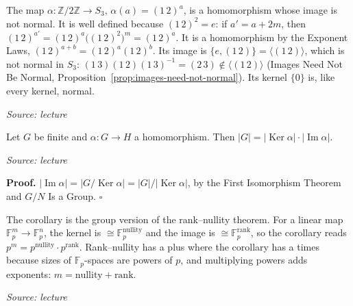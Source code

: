 \documentclass[11pt]{report}
\renewenvironment{proof}[1][Proof]{\noindent\textbf{#1.} }{\hfill$\square$\par\vspace{5pt}}
\newcommand{\srcline}[1]{\par\hfill{\footnotesize\textit{Source: #1}}}
\begin{document}
\begin{exbox}\label{ex:first-iso-z2-to-s3-non-normal-image}
The map $\alpha: \mathbb{Z}/2\mathbb{Z} \to S_3$, $\alpha(a) = (1\,2)^a$, is a homomorphism whose image is not normal. It is well defined because $(1\,2)^2 = e$: if $a' = a + 2m$, then $(1\,2)^{a'} = (1\,2)^a\big((1\,2)^2\big)^m = (1\,2)^a$. It is a homomorphism by the Exponent Laws, $(1\,2)^{a + b} = (1\,2)^a(1\,2)^b$. Its image is $\{e, (1\,2)\} = \langle (1\,2) \rangle$, which is not normal in $S_3$: $(1\,3)(1\,2)(1\,3)^{-1} = (2\,3) \notin \langle (1\,2) \rangle$ (Images Need Not Be Normal, Proposition~\ref{prop:images-need-not-normal}). Its kernel $\{0\}$ is, like every kernel, normal.
\srcline{lecture}
\end{exbox}

\begin{corbox}[{$|G| = |\operatorname{Ker}\alpha| \cdot |\operatorname{Im}\alpha|$}]\label{cor:g-ker-alpha-im-alpha}
Let $G$ be finite and $\alpha: G \to H$ a homomorphism. Then $|G| = |\operatorname{Ker}\alpha| \cdot |\operatorname{Im}\alpha|$.
\srcline{lecture}
\end{corbox}

\begin{proof}
$|\operatorname{Im}\alpha| = |G/\operatorname{Ker}\alpha| = |G|/|\operatorname{Ker}\alpha|$, by the First Isomorphism Theorem and $G/N$ Is a Group.
\end{proof}

\begin{rembox}\label{rem:rank-nullity}
The corollary is the group version of the rank--nullity theorem. For a linear map $\mathbb{F}_p^m \to \mathbb{F}_p^n$, the kernel is $\cong \mathbb{F}_p^{\text{nullity}}$ and the image is $\cong \mathbb{F}_p^{\text{rank}}$, so the corollary reads $p^m = p^{\text{nullity}} \cdot p^{\text{rank}}$. Rank--nullity has a plus where the corollary has a times because sizes of $\mathbb{F}_p$-spaces are powers of $p$, and multiplying powers adds exponents: $m = \text{nullity} + \text{rank}$.
\srcline{lecture}
\end{rembox}
\end{document}
